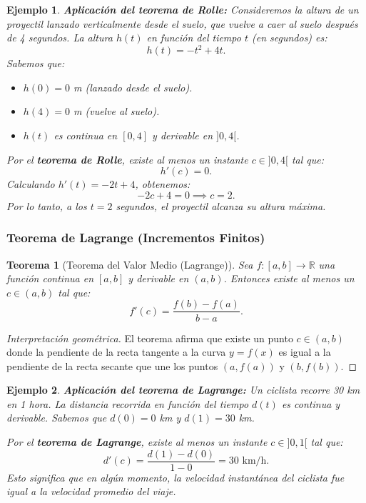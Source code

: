 \documentclass[12pt, a4paper]{article}
\theoremstyle{rioplatense}
\newtheorem{teorema}{Teorema}[section]
\newtheorem{ejemplo}{Ejemplo}[section]
\begin{document}
\begin{ejemplo}
\textbf{Aplicación del teorema de Rolle:} Consideremos la altura de un proyectil lanzado verticalmente desde el suelo, que vuelve a caer al suelo después de 4 segundos. La altura $h(t)$ en función del tiempo $t$ (en segundos) es:
\[
h(t) = -t^2 + 4t.
\]
Sabemos que:
\begin{itemize}
    \item $h(0) = 0$ m (lanzado desde el suelo).
    \item $h(4) = 0$ m (vuelve al suelo).
    \item $h(t)$ es continua en $[0, 4]$ y derivable en $]0, 4[$.
\end{itemize}

Por el \textbf{teorema de Rolle}, existe al menos un instante $c \in ]0, 4[$ tal que:
\[
h'(c) = 0.
\]
Calculando $h'(t) = -2t + 4$, obtenemos:
\[
-2c + 4 = 0 \implies c = 2.
\]
Por lo tanto, a los $t = 2$ segundos, el proyectil alcanza su altura máxima.
\end{ejemplo}

\subsubsection{Teorema de Lagrange (Incrementos Finitos)}
\begin{teorema}[Teorema del Valor Medio (Lagrange)]
    Sea $f: [a, b] \to \mathbb{R}$ una función continua en $[a, b]$ y derivable en $(a, b)$. Entonces existe al menos un $c \in (a, b)$ tal que:
    $$
    f'(c) = \frac{f(b) - f(a)}{b - a}.
    $$
\end{teorema}

\begin{proof}[Interpretación geométrica]
    El teorema afirma que existe un punto $c \in (a, b)$ donde la pendiente de la recta tangente a la curva $y = f(x)$ es igual a la pendiente de la recta secante que une los puntos $(a, f(a))$ y $(b, f(b))$.
\end{proof}

\begin{ejemplo}
\textbf{Aplicación del teorema de Lagrange:} Un ciclista recorre 30 km en 1 hora. La distancia recorrida en función del tiempo $d(t)$ es continua y derivable. Sabemos que $d(0) = 0$ km y $d(1) = 30$ km.

Por el \textbf{teorema de Lagrange}, existe al menos un instante $c \in ]0, 1[$ tal que:
\[
d'(c) = \frac{d(1) - d(0)}{1 - 0} = 30 \text{ km/h}.
\]
Esto significa que en algún momento, la velocidad instantánea del ciclista fue igual a la velocidad promedio del viaje.
\end{ejemplo}
\end{document}
